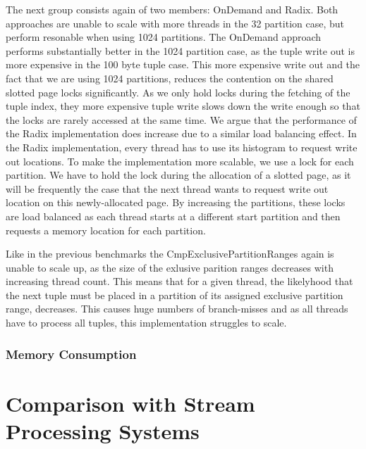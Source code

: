 The next group consists again of two members: OnDemand and Radix.
Both approaches are unable to scale with more threads in the 32 partition case, but perform resonable when using 1024 partitions.
The OnDemand approach performs substantially better in the 1024 partition case, as the tuple write out is more expensive in the 100 byte tuple case.
This more expensive write out and the fact that we are using 1024 partitions, reduces the contention on the shared slotted page locks significantly.
As we only hold locks during the fetching of the tuple index, they more expensive tuple write slows down the write enough so that the locks are rarely accessed at the same time.
We argue that the performance of the Radix implementation does increase due to a similar load balancing effect.
In the Radix implementation, every thread has to use its histogram to request write out locations.
To make the implementation more scalable, we use a lock for each partition.
We have to hold the lock during the allocation of a slotted page, as it will be frequently the case that the next thread wants to request write out location on this newly-allocated page.
By increasing the partitions, these locks are load balanced as each thread starts at a different start partition and then requests a memory location for each partition.

Like in the previous benchmarks the CmpExclusivePartitionRanges again is unable to scale up, as the size of the exlusive parition ranges decreases with increasing thread count.
This means that for a given thread, the likelyhood that the next tuple must be placed in a partition of its assigned exclusive partition range, decreases.
This causes huge numbers of branch-misses and as all threads have to process all tuples, this implementation struggles to scale.

\subsubsection{Memory Consumption}

\section{Comparison with Stream Processing Systems}
